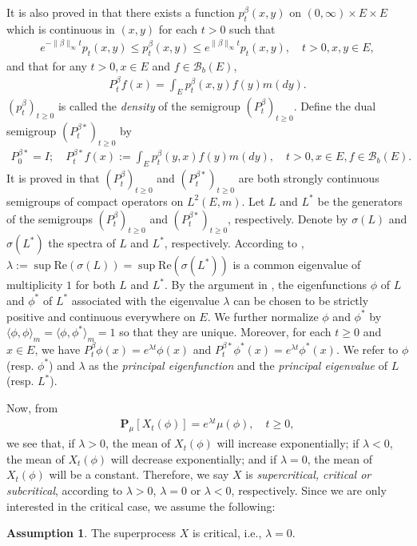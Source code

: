 \documentclass[12pt,a4paper]{amsart}
\theoremstyle{definition}
\newtheorem{asp}{Assumption}
\numberwithin{equation}{section}
\begin{document}
It is also proved in \cite{RenSongZhang2015Limit, RenSongZhang2017Central} that there exists a function $p^\beta_t(x,y)$ on $(0,\infty) \times E \times E$ which is continuous in $(x,y)$ for each $t>0$ such that
\begin{align}
	e^{-\|\beta\|_\infty t} p_t(x,y)
	\leq p^{\beta}_t(x,y)
	\leq e^{\|\beta\|_\infty t} p_t(x,y),
	\quad t>0, x, y\in E,
\end{align}
and that for any $t>0, x\in E$ and $f \in \mathscr B_b(E)$,
\begin{align}
	P^\beta_t f(x)
	= \int_E p_t^\beta (x,y) f(y) m(dy).
\end{align}
$(p^\beta_t)_{t\geq 0}$ is called the
\emph{density}  of the semigroup $(P^\beta_t)_{t\geq 0}$.
Define the dual semigroup $(P^{\beta *}_t)_{t \geq 0}$ by
\begin{align}
	P^{\beta *}_0 = I;
	\quad P^{\beta *}_t f(x)
	:= \int_E p^\beta_t (y,x) f(y) m(dy),
	\quad t>0, x\in E, f\in \mathscr B_b(E).
\end{align}
It is proved in \cite{RenSongZhang2015Limit, RenSongZhang2017Central} that $(P^\beta_t)_{t \geq 0}$ and $(P^{\beta *}_t)_{t \geq 0}$ are both strongly continuous semigroups of compact operators on $L^2(E,m)$.
Let $L$ and $L^*$ be the generators of the semigroups $(P^\beta_t)_{t \geq 0}$ and $(P^{\beta *}_t)_{t \geq 0}$, respectively.
Denote by $\sigma(L)$ and $\sigma(L^*)$ the spectra of $L$ and $L^*$, respectively.
According to \cite[Theorem V.6.6]{Schaefer1974Banach}, $\lambda := \sup \text{Re}(\sigma(L)) = \sup \text{Re}(\sigma(L^*))$ is a common eigenvalue of multiplicity $1$ for both $L$ and $L^*$.
By the argument in \cite{RenSongZhang2015Limit}, the eigenfunctions $\phi$ of $L$ and $\phi^*$ of $L^*$ associated with the eigenvalue $\lambda$ can be chosen to be strictly positive and continuous everywhere on $E$.
We further normalize $\phi$ and $\phi^*$ by $\langle\phi, \phi\rangle_m = \langle\phi,\phi^*\rangle_m = 1$ so that they are unique.
  Moreover, for each $t\geq 0$ and $x\in E$, we have $P^\beta_t \phi(x) = e^{\lambda t} \phi(x)$ and $P^{\beta *}_t \phi^*(x) = e^{\lambda t} \phi^*(x)$.
We refer to $\phi$ (resp. $\phi^*$) and $\lambda$ as the \emph{principal eigenfunction} and the \emph{principal eigenvalue} of $L$ (resp. $L^*$).
	
Now, from
\begin{align}
	\mathbf P_\mu[X_t(\phi)]
	= e^{\lambda t} \mu(\phi),
	\quad t \geq 0,
\end{align}
we see that, if $\lambda > 0$, the mean of $X_t(\phi)$ will increase exponentially; if $\lambda < 0$, the mean of $X_t(\phi)$ will decrease exponentially; and if $\lambda = 0$, the mean of $X_t(\phi)$ will be a constant.
Therefore, we say $X$ is \emph{supercritical, critical or subcritical}, according to $\lambda > 0$, $\lambda = 0$ or $\lambda < 0$, respectively.
Since we are only interested in the critical case, we assume the following:
\begin{asp} \label{asp: 2}
  The superprocess $X$ is critical, i.e., $\lambda = 0$.
\end{asp}
\end{document}
